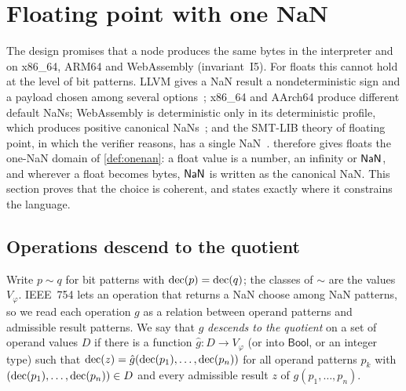 \section{Floating point with one NaN}\label{sec:float}

The design promises that a node produces the same bytes in the interpreter and on x86\_64,
ARM64 and WebAssembly (invariant~I5). For floats this cannot hold at the level of bit patterns.
LLVM gives a NaN result a nondeterministic sign and a payload chosen among several
options~\cite{llvm-langref}; x86\_64 and AArch64 produce different default NaNs; WebAssembly is
deterministic only in its deterministic profile, which produces positive canonical
NaNs~\cite{wasm-spec}; and the SMT-LIB theory of floating point, in which the verifier reasons,
has a single NaN~\cite{brain2015fp}. \VG{} therefore gives floats the one-NaN domain of
\cref{def:onenan}: a float value is a number, an infinity or $\mathsf{NaN}$, and wherever a float
becomes bytes, $\mathsf{NaN}$ is written as the canonical NaN. This section proves that the choice is
coherent, and states exactly where it constrains the language.

\subsection{Operations descend to the quotient}

Write $p\sim q$ for bit patterns with $\mathrm{dec}(p)=\mathrm{dec}(q)$; the classes of $\sim$ are the values
$V_\varphi$. IEEE~754 lets an operation that returns a NaN choose among NaN patterns, so we read
each operation $g$ as a relation between operand patterns and admissible result patterns. We
say that $g$ \emph{descends to the quotient} on a set of operand values $D$ if there is a
function $\hat g : D\to V_\varphi$ (or into $\mathsf{Bool}$, or an integer type) such that
$\mathrm{dec}(z)=\hat g(\mathrm{dec}(p_1),\dots,\mathrm{dec}(p_n))$ for all operand patterns $p_k$ with
$(\mathrm{dec}(p_1),\dots,\mathrm{dec}(p_n))\in D$ and every admissible result $z$ of $g(p_1,\dots,p_n)$.

